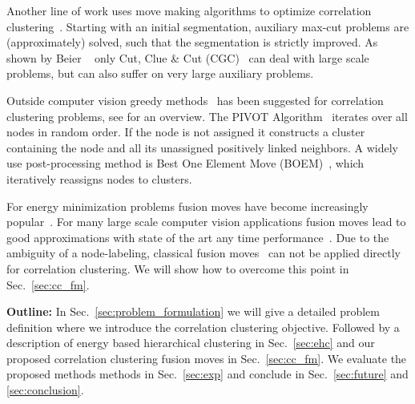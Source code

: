 Another line of work uses move making algorithms 
to optimize correlation clustering~\cite{bansal_2004_ml,beier_2014_cvpr,Kernighan-1970}.
Starting with an initial segmentation, auxiliary max-cut problems are (approximately) solved,
such that the segmentation is strictly improved.
As shown by Beier \etal~\cite{beier_2014_cvpr} only Cut, Clue \& Cut (CGC)~\cite{beier_2014_cvpr} 
can deal with large scale problems, but can also suffer on very large auxiliary problems.

Outside computer vision greedy methods~\cite{Soon-2001,Ng-2002,Gionis-2007,Elsner-2008,Ailon-2008} has been suggested for correlation clustering problems, see \cite{Elsner-2009} for an overview.
The PIVOT Algorithm~\cite{Ailon-2008} iterates over all nodes in random order.
If the node is not assigned it constructs a cluster containing the node and all its 
unassigned positively linked neighbors.  
%
A widely use post-processing method is  Best One Element Move (BOEM)~\cite{Gionis-2007}, which iteratively reassigns nodes to clusters.

For energy minimization problems fusion moves have become increasingly popular~\cite{Lempitsky-2010,kappes_2014_ws}.
For many large scale computer vision applications fusion moves lead to good approximations
with state of the art any time performance~\cite{kappes_2014_ws}.
Due to the ambiguity of a node-labeling, classical fusion moves~\cite{Lempitsky-2010} can not be applied directly for correlation clustering.
We will show how to overcome this point in Sec.~\ref{sec:cc_fm}.


\vspace{0.1cm}
\noindent \textbf{Outline:} 
In Sec.~\ref{sec:problem_formulation} we will give a 
detailed problem definition where we introduce 
the correlation clustering objective.
Followed by a description of energy based hierarchical clustering in Sec.~\ref{sec:ehc} and
our proposed correlation clustering fusion moves in Sec.~\ref{sec:cc_fm}.
We evaluate the proposed methods methods in Sec.~\ref{sec:exp} and conclude in Sec.~\ref{sec:future} and \ref{sec:conclusion}.



